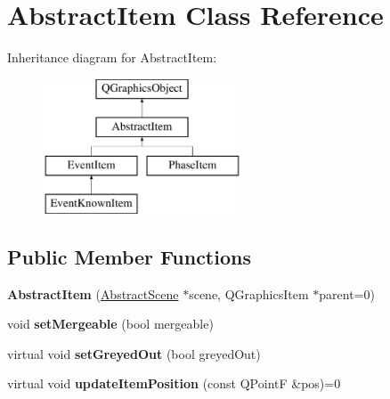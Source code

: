 \hypertarget{class_abstract_item}{\section{Abstract\-Item Class Reference}
\label{class_abstract_item}
}
Inheritance diagram for Abstract\-Item\-:\begin{figure}[H]
\begin{center}
\leavevmode
\includegraphics[height=4.000000cm]{class_abstract_item}
\end{center}
\end{figure}
\subsection*{Public Member Functions}
\begin{DoxyCompactItemize}
\item 
\hypertarget{class_abstract_item_af044e66c1f07484e40622d6253d2a8a0}{{\bfseries Abstract\-Item} (\hyperlink{class_abstract_scene}{Abstract\-Scene} $\ast$scene, Q\-Graphics\-Item $\ast$parent=0)}\label{class_abstract_item_af044e66c1f07484e40622d6253d2a8a0}

\item 
\hypertarget{class_abstract_item_a6ec04efa433724abc24008c77f1143d4}{void {\bfseries set\-Mergeable} (bool mergeable)}\label{class_abstract_item_a6ec04efa433724abc24008c77f1143d4}

\item 
\hypertarget{class_abstract_item_a40c8e6bffd654dc500b969c9ebd9e55f}{virtual void {\bfseries set\-Greyed\-Out} (bool greyed\-Out)}\label{class_abstract_item_a40c8e6bffd654dc500b969c9ebd9e55f}

\item 
\hypertarget{class_abstract_item_af15804f7d59c354807bfdd2270aaa214}{virtual void {\bfseries update\-Item\-Position} (const Q\-Point\-F \&pos)=0}\label{class_abstract_item_af15804f7d59c354807bfdd2270aaa214}

\end{DoxyCompactItemize}
